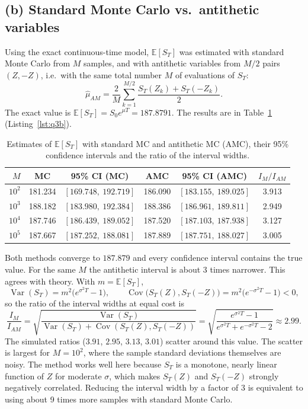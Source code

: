 \documentclass[11pt,a4paper]{article}
\begin{document}
\subsection*{(b) Standard Monte Carlo vs.\ antithetic variables}

Using the exact continuous-time model, $\mathbb E[S_T]$ was estimated with standard Monte Carlo
from $M$ samples, and with antithetic variables from $M/2$ pairs $(Z, -Z)$, i.e.\ with the same
total number $M$ of evaluations of $S_T$:
\[
  \hat\mu_{AM} = \frac{2}{M}\sum_{k=1}^{M/2} \frac{S_T(Z_k) + S_T(-Z_k)}{2}.
\]
The exact value is $\mathbb E[S_T] = S_0 e^{\mu T} = 187.8791$. The results are in
Table~\ref{tab:q3b} (Listing~\ref{lst:q3b}).

\begin{table}[H]
  \centering
  \small
  \begin{tabular}{rccccc}
    \toprule
    $M$ & MC & 95\% CI (MC) & AMC & 95\% CI (AMC) & $I_M / I_{AM}$ \\
    \midrule
    $10^2$ & 181.234 & $[169.748,\ 192.719]$ & 186.090 & $[183.155,\ 189.025]$ & 3.913 \\
    $10^3$ & 188.182 & $[183.980,\ 192.384]$ & 188.386 & $[186.961,\ 189.811]$ & 2.949 \\
    $10^4$ & 187.746 & $[186.439,\ 189.052]$ & 187.520 & $[187.103,\ 187.938]$ & 3.127 \\
    $10^5$ & 187.667 & $[187.252,\ 188.081]$ & 187.889 & $[187.751,\ 188.027]$ & 3.005 \\
    \bottomrule
  \end{tabular}
  \caption{Estimates of $\mathbb E[S_T]$ with standard MC and antithetic MC (AMC), their 95\%
  confidence intervals and the ratio of the interval widths.}
  \label{tab:q3b}
\end{table}

Both methods converge to $187.879$ and every confidence interval contains the true value. For
the same $M$ the antithetic interval is about 3 times narrower. This agrees with theory. With
$m = \mathbb E[S_T]$,
\[
  \operatorname{Var}(S_T) = m^2\big(e^{\sigma^2 T} - 1\big), \qquad
  \operatorname{Cov}\big(S_T(Z), S_T(-Z)\big) = m^2\big(e^{-\sigma^2 T} - 1\big) < 0,
\]
so the ratio of the interval widths at equal cost is
\[
  \frac{I_M}{I_{AM}} = \sqrt{\frac{\operatorname{Var}(S_T)}{\operatorname{Var}(S_T) + \operatorname{Cov}(S_T(Z),S_T(-Z))}}
  = \sqrt{\frac{e^{\sigma^2 T} - 1}{e^{\sigma^2 T} + e^{-\sigma^2 T} - 2}} \approx 2.99 .
\]
The simulated ratios ($3.91$, $2.95$, $3.13$, $3.01$) scatter around this value. The scatter is
largest for $M = 10^2$, where the sample standard deviations themselves are noisy. The method
works well here because $S_T$ is a monotone, nearly linear function of $Z$ for moderate $\sigma$,
which makes $S_T(Z)$ and $S_T(-Z)$ strongly negatively correlated. Reducing the interval width by
a factor of 3 is equivalent to using about 9 times more samples with standard Monte Carlo.
\end{document}
